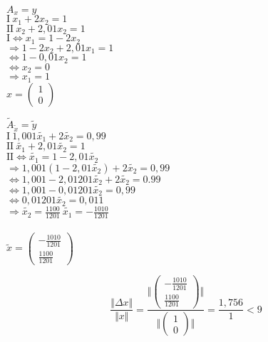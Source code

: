 \documentclass[a4paper,10pt]{article}
\begin{document}
\begin{enumerate}[a)]
\begin{enumerate}[b1)]
			\begin{multicols}{2}
				\begin{center}
					$A_x = y$\\
					$\mathrm{I} \ x_1 + 2x_2 = 1$\\
					$\mathrm{II} \ x_2 + 2,01x_2 = 1$\\
					$\mathrm{I} \Leftrightarrow x_1 = 1 -2x_2$\\
					$\Rightarrow 1 -2x_2 + 2,01x_1 = 1$\\
					$\Leftrightarrow 1 - 0,01x_2 = 1$\\
					$\Leftrightarrow x_2 = 0$\\
					$\Rightarrow x_1 = 1$\\
					$x = \begin{pmatrix}
					1\\
					0
					\end{pmatrix}
					$
				\end{center}
				\columnbreak
				\begin{center}
					$\tilde{A}_{\tilde{x}} = \tilde{y}$\\
					$\mathrm{I} \ 1,001 \tilde{x_1} + 2\tilde{x_2} = 0,99$\\
					$\mathrm{II} \ \tilde{x_1} + 2,01\tilde{x_2} = 1$\\
					$\mathrm{II} \Leftrightarrow \tilde{x_1} = 1 - 2,01\tilde{x_2}$\\
					$\Rightarrow 1,001(1 - 2,01\tilde{x_2}) + 2\tilde{x_2} = 0,99$\\
					$\Leftrightarrow 1,001 - 2,01201\tilde{x_2} + 2\tilde{x_2} = 0.99$\\
					$\Leftrightarrow 1,001 - 0,01201\tilde{x_2} = 0,99$\\
					$\Leftrightarrow 0,01201 \tilde{x_2} = 0,011$\\
					$\Rightarrow \tilde{x_2} = \frac{1100}{1201} \ \tilde{x_1} = -\frac{1010}{1201}$\\ \ \\
					$\tilde{x} = 
					\begin{pmatrix}
					-\frac{1010}{1201}\\[2pt]
					\frac{1100}{1201}
					\end{pmatrix}$
				\end{center}
			\end{multicols}
			\[
			\dfrac{\Vert \varDelta x \Vert}{\Vert x \Vert} = \dfrac{\Big \Vert \begin{pmatrix} -\frac{1010}{1201} \\[2pt] \frac{1100}{1201} \end{pmatrix} \Big \Vert} {\Big \Vert \begin{pmatrix} 1\\ 0 \end{pmatrix} \Big \Vert} = \dfrac{1,756}{1} < 9
			\]
		\end{enumerate}
		
		
	\end{enumerate}
	
	
	
\end{document}
